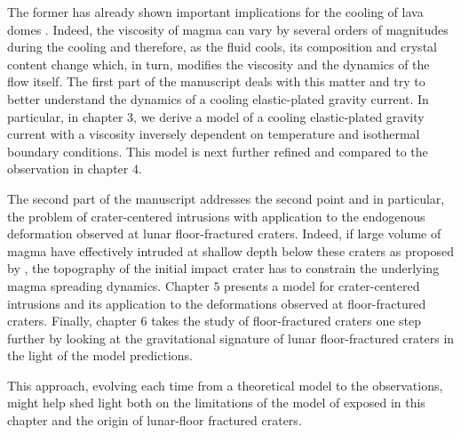 The former has already shown important implications for the cooling of
lava                                                             domes
\citep{Bercovici:2007vc,Bercovici:1996uu,BALMFORTH:1999ey,Garel:2014era}. Indeed,
the viscosity of magma can vary by several orders of magnitudes during
the  cooling \citep{Anonymous:CZVBrBvv,Lejeune:1995fc}  and therefore,
as the fluid cools, its  composition and crystal content change which,
in  turn,  modifies  the  viscosity  and  the  dynamics  of  the  flow
itself. The  first part of the  manuscript deals with this  matter and
try  to better  understand the  dynamics of  a cooling  elastic-plated
gravity current.  In particular, in chapter  $3$, we derive a model of
a cooling  elastic-plated gravity  current with a  viscosity inversely
dependent  on temperature  and isothermal  boundary conditions.   This
model  is next  further refined  and  compared to  the observation  in
chapter $4$.

The second  part of the manuscript  addresses the second point  and in
particular, the problem of crater-centered intrusions with application
to the endogenous deformation observed at lunar floor-fractured craters.
Indeed, if large volume of  magma have effectively intruded at shallow
depth below  these craters as proposed  by \citet{Schultz:1976kt}, the
topography  of  the  initial  impact   crater  has  to  constrain  the
underlying magma spreading dynamics. Chapter  $5$ presents a model for
crater-centered  intrusions and  its application  to the  deformations
observed at  floor-fractured craters.  Finally, chapter  $6$ takes the
study of  floor-fractured craters one  step further by looking  at the
gravitational signature of lunar  floor-fractured craters in the light
of the model predictions.

This  approach, evolving  each time  from a  theoretical model  to the
observations, might  help shed  light both on  the limitations  of the
model of \citet{Michaut:2011kg} exposed in this chapter and the origin
of lunar-floor fractured craters.

\newpage





